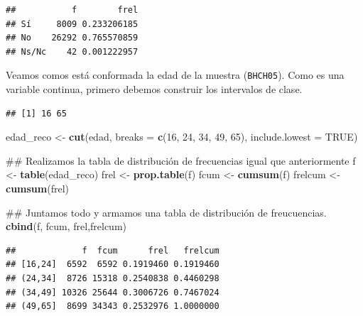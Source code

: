 \documentclass[spanish,]{book}
\newenvironment{Shaded}{\begin{snugshade}}{\end{snugshade}}
\newcommand{\KeywordTok}[1]{\textcolor[rgb]{0.13,0.29,0.53}{\textbf{#1}}}
\newcommand{\DataTypeTok}[1]{\textcolor[rgb]{0.13,0.29,0.53}{#1}}
\newcommand{\DecValTok}[1]{\textcolor[rgb]{0.00,0.00,0.81}{#1}}
\newcommand{\StringTok}[1]{\textcolor[rgb]{0.31,0.60,0.02}{#1}}
\newcommand{\OtherTok}[1]{\textcolor[rgb]{0.56,0.35,0.01}{#1}}
\newcommand{\OperatorTok}[1]{\textcolor[rgb]{0.81,0.36,0.00}{\textbf{#1}}}
\newcommand{\NormalTok}[1]{#1}
\begin{document}
\begin{verbatim}
##           f        frel
## Sí     8009 0.233206185
## No    26292 0.765570859
## Ns/Nc    42 0.001222957
\end{verbatim}

Veamos comos está conformada la edad de la muestra (\texttt{BHCH05}).
Como es una variable continua, primero debemos construir los intervalos
de clase.

\begin{Shaded}
\end{Shaded}

\begin{verbatim}
## [1] 16 65
\end{verbatim}

\begin{Shaded}
\begin{Highlighting}[]
\NormalTok{edad_reco <-}\StringTok{ }\KeywordTok{cut}\NormalTok{(edad, }\DataTypeTok{breaks =} \KeywordTok{c}\NormalTok{(}\DecValTok{16}\NormalTok{, }\DecValTok{24}\NormalTok{, }\DecValTok{34}\NormalTok{, }\DecValTok{49}\NormalTok{, }\DecValTok{65}\NormalTok{), }\DataTypeTok{include.lowest =} \OtherTok{TRUE}\NormalTok{)}

\NormalTok{## Realizamos la tabla de distribución de frecuencias igual que anteriormente}
\NormalTok{f <-}\StringTok{ }\KeywordTok{table}\NormalTok{(edad_reco)}
\NormalTok{frel <-}\StringTok{ }\KeywordTok{prop.table}\NormalTok{(f)}
\NormalTok{fcum <-}\StringTok{ }\KeywordTok{cumsum}\NormalTok{(f)}
\NormalTok{frelcum <-}\StringTok{ }\KeywordTok{cumsum}\NormalTok{(frel)}

\NormalTok{## Juntamos todo y armamos una tabla de distribución de freucuencias.}
\KeywordTok{cbind}\NormalTok{(f, fcum, frel,frelcum)}
\end{Highlighting}
\end{Shaded}

\begin{verbatim}
##             f  fcum      frel   frelcum
## [16,24]  6592  6592 0.1919460 0.1919460
## (24,34]  8726 15318 0.2540838 0.4460298
## (34,49] 10326 25644 0.3006726 0.7467024
## (49,65]  8699 34343 0.2532976 1.0000000
\end{verbatim}
\end{document}
